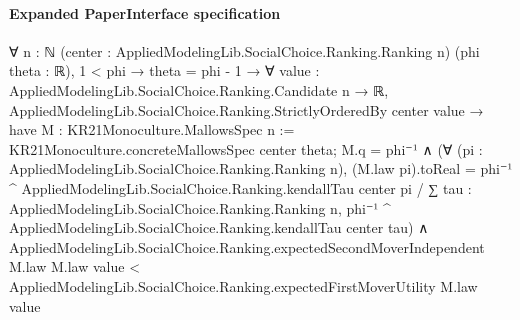 \documentclass[10pt]{article}
\begin{document}
\paragraph{Expanded PaperInterface specification}
\begin{ReviewVerbatim}
∀ {n : ℕ} (center : AppliedModelingLib.SocialChoice.Ranking.Ranking n) (phi theta : ℝ),
  1 < phi →
    theta = phi - 1 →
      ∀ {value : AppliedModelingLib.SocialChoice.Ranking.Candidate n → ℝ},
        AppliedModelingLib.SocialChoice.Ranking.StrictlyOrderedBy center value →
          have M : KR21Monoculture.MallowsSpec n := KR21Monoculture.concreteMallowsSpec center theta;
          M.q = phi⁻¹ ∧
            (∀ (pi : AppliedModelingLib.SocialChoice.Ranking.Ranking n),
                (M.law pi).toReal =
                  phi⁻¹ ^ AppliedModelingLib.SocialChoice.Ranking.kendallTau center pi /
                    ∑ tau : AppliedModelingLib.SocialChoice.Ranking.Ranking n,
                      phi⁻¹ ^ AppliedModelingLib.SocialChoice.Ranking.kendallTau center tau) ∧
              AppliedModelingLib.SocialChoice.Ranking.expectedSecondMoverIndependent M.law M.law value <
                AppliedModelingLib.SocialChoice.Ranking.expectedFirstMoverUtility M.law value
\end{ReviewVerbatim}
\end{document}
